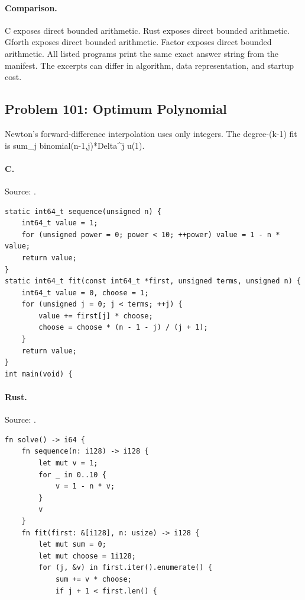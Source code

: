 \paragraph{Comparison.}
C exposes direct bounded arithmetic. Rust exposes direct bounded arithmetic. Gforth exposes direct bounded arithmetic. Factor exposes direct bounded arithmetic.
All listed programs print the same exact answer string from the manifest. The excerpts can differ in algorithm, data representation, and startup cost.

\subsection{Problem 101: Optimum Polynomial}
\label{walkthrough:p101}
Newton's forward-difference interpolation uses only integers. The degree-(k-1) fit is sum\_j binomial(n-1,j)*Delta\textasciicircum{}j u(1).

\paragraph{C.} Source: .
\begin{lstlisting}
static int64_t sequence(unsigned n) {
    int64_t value = 1;
    for (unsigned power = 0; power < 10; ++power) value = 1 - n * value;
    return value;
}
static int64_t fit(const int64_t *first, unsigned terms, unsigned n) {
    int64_t value = 0, choose = 1;
    for (unsigned j = 0; j < terms; ++j) {
        value += first[j] * choose;
        choose = choose * (n - 1 - j) / (j + 1);
    }
    return value;
}
int main(void) {
\end{lstlisting}

\paragraph{Rust.} Source: .
\begin{lstlisting}
fn solve() -> i64 {
    fn sequence(n: i128) -> i128 {
        let mut v = 1;
        for _ in 0..10 {
            v = 1 - n * v;
        }
        v
    }
    fn fit(first: &[i128], n: usize) -> i128 {
        let mut sum = 0;
        let mut choose = 1i128;
        for (j, &v) in first.iter().enumerate() {
            sum += v * choose;
            if j + 1 < first.len() {
\end{lstlisting}

